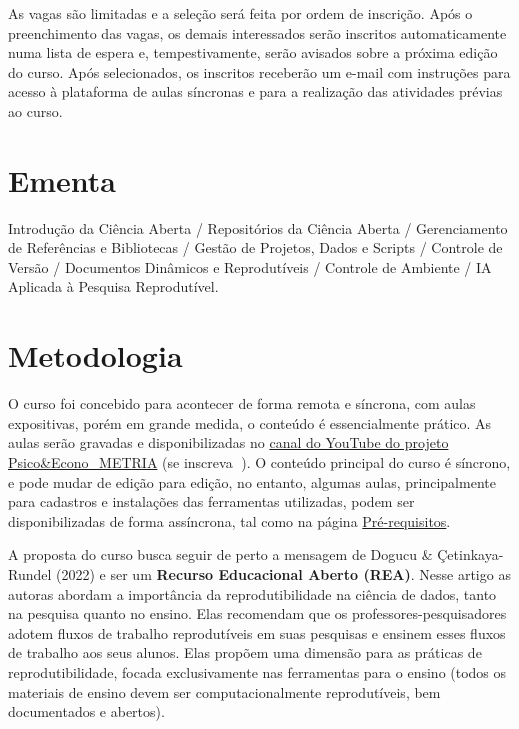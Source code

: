 \documentclass[
  a4paper,
]{book}
\newcommand{\emojitext}[1]{{\emoji #1}}
\begin{document}
As vagas são limitadas e a seleção será feita por ordem de inscrição.
Após o preenchimento das vagas, os demais interessados serão inscritos
automaticamente numa lista de espera e, tempestivamente, serão avisados
sobre a próxima edição do curso. Após selecionados, os inscritos
receberão um e-mail com instruções para acesso à plataforma de aulas
síncronas e para a realização das atividades prévias ao curso.

\section*{Ementa}\label{sec-ementa}


Introdução da Ciência Aberta / Repositórios da Ciência Aberta /
Gerenciamento de Referências e Bibliotecas / Gestão de Projetos, Dados e
Scripts / Controle de Versão / Documentos Dinâmicos e Reprodutíveis /
Controle de Ambiente / IA Aplicada à Pesquisa Reprodutível.

\section*{Metodologia}\label{sec-method}


O curso foi concebido para acontecer de forma remota e síncrona, com
aulas expositivas, porém em grande medida, o conteúdo é essencialmente
prático. As aulas serão gravadas e disponibilizadas no
\href{https://www.youtube.com/c/PsicoEconoMETRIA}{canal do YouTube do
projeto Psico\&Econo\_METRIA} (se inscreva \emojitext{🥰}). O conteúdo
principal do curso é síncrono, e pode mudar de edição para edição, no
entanto, algumas aulas, principalmente para cadastros e instalações das
ferramentas utilizadas, podem ser disponibilizadas de forma assíncrona,
tal como na página \href{00-prework.html}{Pré-requisitos}.

A proposta do curso busca seguir de perto a mensagem de Dogucu \&
Çetinkaya-Rundel (2022) e ser um \textbf{Recurso Educacional Aberto
(REA)}. Nesse artigo as autoras abordam a importância da
reprodutibilidade na ciência de dados, tanto na pesquisa quanto no
ensino. Elas recomendam que os professores-pesquisadores adotem fluxos
de trabalho reprodutíveis em suas pesquisas e ensinem esses fluxos de
trabalho aos seus alunos. Elas propõem uma dimensão para as práticas de
reprodutibilidade, focada exclusivamente nas ferramentas para o ensino
(todos os materiais de ensino devem ser computacionalmente
reprodutíveis, bem documentados e abertos).
\end{document}
